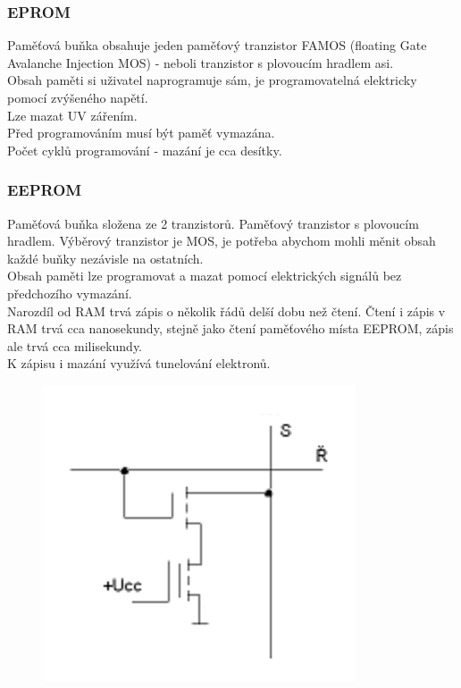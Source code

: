 \subsubsection*{EPROM}
Paměťová buňka obsahuje jeden paměťový tranzistor FAMOS (floating Gate Avalanche Injection MOS) - neboli tranzistor s plovoucím hradlem asi. \\
Obsah paměti si uživatel naprogramuje sám, je programovatelná elektricky pomocí zvýšeného napětí. \\
Lze mazat UV zářením. \\
Před programováním musí být paměť vymazána. \\
Počet cyklů programování - mazání je cca desítky. \\

\subsubsection*{EEPROM}
Paměťová buňka složena ze 2 tranzistorů. Paměťový tranzistor s plovoucím hradlem. Výběrový tranzistor je MOS, je potřeba abychom mohli měnit obsah každé buňky nezávisle na ostatních. \\
Obsah paměti lze programovat a mazat pomocí elektrických
signálů bez předchozího vymazání. \\
Narozdíl od RAM trvá zápis o několik řádů delší dobu než čtení.     Čtení i zápis v RAM trvá cca nanosekundy, stejně jako čtení paměťového místa EEPROM, zápis ale trvá cca milisekundy. \\
K zápisu i mazání využívá tunelování elektronů. \\
\begin{figure}[h!]
    \centering
    \includegraphics[scale = 0.5]{img/EEPROM.png}
\end{figure}

